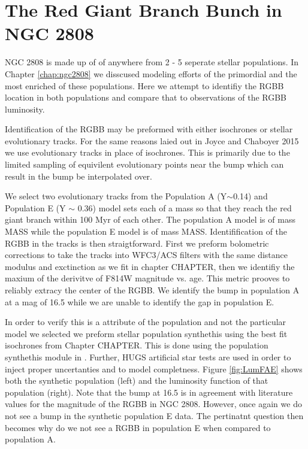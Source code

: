 \section{The Red Giant Branch Bunch in NGC 2808}
NGC 2808 is made up of of anywhere from 2 - 5 seperate stellar populations. In
Chapter \ref{chap:ngc2808} we disscused modeling efforts of the primordial
and the most enriched of these populations. Here we attempt to identifiy the
RGBB location in both populations and compare that to observations of the RGBB
luminosity.

Identification of the RGBB may be preformed with either isochrones or stellar
evolutionary tracks. For the same reasons laied out in {\color{red} Joyce and
Chaboyer 2015} we use evolutionary tracks in place of isochrones. This is
primarily due to the limited sampling of equivilent evolutionary points near
the bump which can result in the bump be interpolated over. 

We select two evolutionary tracks from the Population A (Y$\sim$0.14) and
Population E (Y $\sim$ 0.36) model sets each of a mass so that they reach the
red giant branch within 100 Myr of each other. The population A model is of
mass {\color{red} MASS} while the population E model is of mass {\color{red}
MASS}. Identifification of the RGBB in the tracks is then straigtforward. First
we preform bolometric corrections to take the tracks into WFC3/ACS filters with
the same distance modulus and exctinction as we fit in chapter {\color{red}
CHAPTER}, then we identifiy the maxium of the derivitve of F814W magnitude vs.
age. This metric prooves to reliably extracy the center of the RGBB. We
identify the bump in population A at a mag of {\color{red}16.5} while we are
unable to identify the gap in population E.

In order to verify this is a attribute of the population and not the particular
model we selected we preform stellar population synthethis using the best fit
isochrones from Chapter {\color{red} CHAPTER}. This is done using the
population synthethis module in \fidanka. Further, HUGS artificial star tests
are used in order to inject proper uncertanties and to model completness.
Figure \ref{fig:LumFAE} shows both the synthetic population (left) and the
luminosity function of that population (right). Note that the bump at
{\color{red}16.5} is in agreement with literature values for the magnitude of the
RGBB in NGC 2808. However, once again we do not see a bump in the synthetic
population E data. The pertinatnt question then becomes why do we not see a
RGBB in population E when compared to population A.

